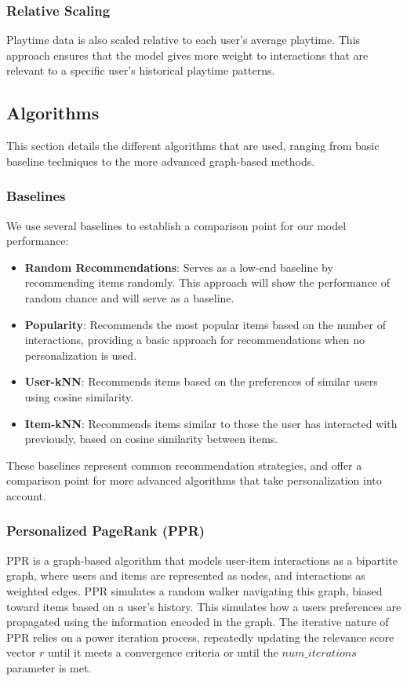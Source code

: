 \documentclass[conference,compsoc]{IEEEtran}
\begin{document}
\subsubsection{Relative Scaling}
Playtime data is also scaled relative to each user's average playtime. This approach ensures that the model gives more weight to interactions that are relevant to a specific user's historical playtime patterns.
\subsection{Algorithms}
This section details the different algorithms that are used, ranging from basic baseline techniques to the more advanced graph-based methods.

\subsubsection{Baselines}
We use several baselines to establish a comparison point for our model performance:
\begin{itemize}
    \item \textbf{Random Recommendations}: Serves as a low-end baseline by recommending items randomly. This approach will show the performance of random chance and will serve as a baseline.
    \item \textbf{Popularity}: Recommends the most popular items based on the number of interactions, providing a basic approach for recommendations when no personalization is used.
    \item \textbf{User-kNN}: Recommends items based on the preferences of similar users using cosine similarity.
    \item \textbf{Item-kNN}: Recommends items similar to those the user has interacted with previously, based on cosine similarity between items.
\end{itemize}
These baselines represent common recommendation strategies, and offer a comparison point for more advanced algorithms that take personalization into account.

\subsubsection{Personalized PageRank (PPR)}
PPR is a graph-based algorithm that models user-item interactions as a bipartite graph, where users and items are represented as nodes, and interactions as weighted edges. PPR simulates a random walker navigating this graph, biased toward items based on a user's history. This simulates how a users preferences are propagated using the information encoded in the graph.  The iterative nature of PPR relies on a power iteration process, repeatedly updating the relevance score vector \(r\) until it meets a convergence criteria or until the \(num\_iterations\) parameter is met.
\end{document}
